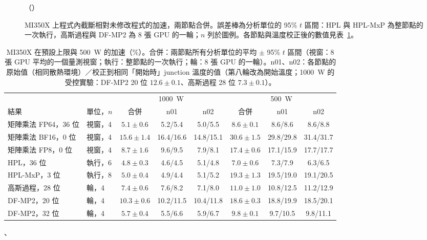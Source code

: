 \begin{figure}[tbp]
\centering
{}
\caption[MI350X 上四個應用在各上限下的加速]{MI350X 上程式內截斷相對未修改程式的加速，兩節點合併。誤差棒為分析單位的 95\% $t$ 區間：HPL 與 HPL-MxP 為整節點的一次執行，高斯過程與 DF-MP2 為 8 張 GPU 的一輪；$n$ 列於圖例。各節點與溫度校正後的數值見表~\ref{tab:mi-robust}。}\label{fig:mi-apps}
\begin{figsource}（）\end{figsource}
\end{figure}

\begin{table}[tbp]
\centering
\caption[MI350X 的主要結果（兩節點、分析單位）]{MI350X 在預設上限與 500~W 的加速（\%）。合併：兩節點所有分析單位的平均 $\pm$ 95\% $t$ 區間（視窗：8 張 GPU 平均的一個量測視窗；執行：整節點的一次執行；輪：8 張 GPU 的一輪）。n01、n02：各節點的原始值（相同散熱環境）／校正到相同「開始時」junction 溫度的值（第八輪改為開始溫度；1000~W 的受控實驗：DF-MP2 20 位 $12.6\pm0.1$、高斯過程 28 位 $7.3\pm0.1$）。}\label{tab:mi-robust}
\footnotesize\setlength{\tabcolsep}{3pt}
\begin{tabular}{@{}llcccccc@{}}
\toprule
& & \multicolumn{3}{c}{1000~W} & \multicolumn{3}{c}{500~W} \\
\cmidrule(lr){3-5}\cmidrule(l){6-8}
結果 & 單位，$n$ & 合併 & n01 & n02 & 合併 & n01 & n02 \\
\midrule
矩陣乘法 FP64，36 位 & 視窗，4 & $5.1\pm0.6$ & 5.2/5.4 & 5.0/5.5 & $8.6\pm0.1$ & 8.6/8.6 & 8.6/8.8 \\
矩陣乘法 BF16，0 位 & 視窗，4 & $15.6\pm1.4$ & 16.4/16.6 & 14.8/15.1 & $30.6\pm1.5$ & 29.8/29.8 & 31.4/31.7 \\
矩陣乘法 FP8，0 位 & 視窗，4 & $8.7\pm1.6$ & 9.6/9.5 & 7.9/8.1 & $17.4\pm0.6$ & 17.1/15.9 & 17.7/17.7 \\
HPL，36 位 & 執行，6 & $4.8\pm0.3$ & 4.6/4.5 & 5.1/4.8 & $7.0\pm0.6$ & 7.3/7.9 & 6.3/6.5 \\
HPL-MxP，3 位 & 執行，8 & $5.0\pm0.4$ & 4.9/4.4 & 5.1/5.2 & $19.3\pm1.3$ & 19.5/19.0 & 19.1/20.5 \\
高斯過程，28 位 & 輪，4 & $7.4\pm0.6$ & 7.6/8.2 & 7.1/8.0 & $11.0\pm1.0$ & 10.8/12.5 & 11.2/12.9 \\
DF-MP2，20 位 & 輪，4 & $10.3\pm0.6$ & 10.2/11.5 & 10.4/11.8 & $18.6\pm0.3$ & 18.8/19.9 & 18.5/20.1 \\
DF-MP2，32 位 & 輪，4 & $5.7\pm0.4$ & 5.5/6.6 & 5.9/6.7 & $9.8\pm0.1$ & 9.7/10.5 & 9.8/11.1 \\
\bottomrule
\end{tabular}
\begin{figsource}、\end{figsource}
\end{table}

